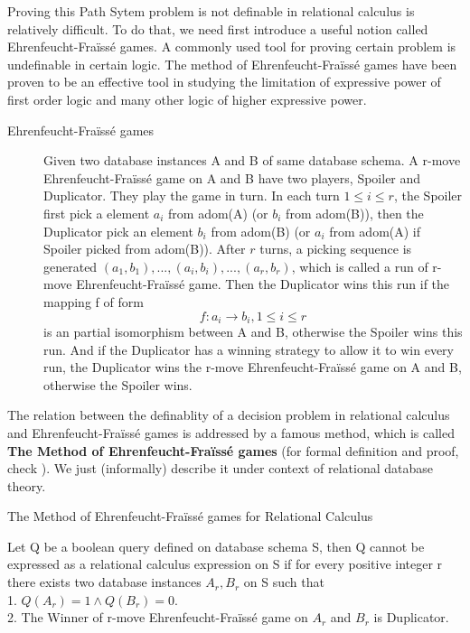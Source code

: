 Proving this Path Sytem problem is not definable in relational calculus is relatively difficult. To do that, we need first introduce a useful notion called Ehrenfeucht-Fra\"iss\'e games. A commonly used tool for proving certain problem is undefinable in certain logic. The method of Ehrenfeucht-Fra\"iss\'e games have been proven to be an effective tool in studying the limitation of expressive power of first order logic and many other logic of higher expressive power.

\begin{description}
\item[Ehrenfeucht-Fra\"iss\'e games]
Given two database instances A and B of same database schema. A r-move Ehrenfeucht-Fra\"iss\'e game on A and B have two players, Spoiler and Duplicator. They play the game in turn. In each turn $1\leq i \leq r$, the Spoiler first pick a element $a_i$ from adom(A) (or $b_i$ from adom(B)), then the Duplicator pick an element $b_i$ from adom(B) (or $a_i$ from adom(A) if Spoiler picked from adom(B)). After $r$ turns, a picking sequence is generated $(a_1, b_1),...,(a_i,b_i),...,(a_r, b_r)$, which is called a run of r-move Ehrenfeucht-Fra\"iss\'e game. Then the Duplicator wins this run if the mapping f of form
$$ f: a_i\rightarrow b_i, 1\leq i \leq r$$
is an partial isomorphism between A and B, otherwise the Spoiler wins this run. And if the Duplicator has a winning strategy to allow it to win every run, the Duplicator wins the r-move Ehrenfeucht-Fra\"iss\'e game on A and B, otherwise the Spoiler wins.
\end{description}

The relation between the definablity of a decision problem in relational calculus and Ehrenfeucht-Fra\"iss\'e games is addressed by a famous method, which is called \textbf{The Method of Ehrenfeucht-Fra\"iss\'e games} (for formal definition and proof, check \cite{kolaitis1}). We just (informally) describe it under context of relational database theory.\\

\begin{description}
\item[The Method of Ehrenfeucht-Fra\"iss\'e games for Relational Calculus]
\end{description}
Let Q be a boolean query defined on database schema S, then Q cannot be expressed as a relational calculus expression on S if for every positive integer r there exists two database instances $A_r, B_r$ on S such that\\
1. $Q(A_r)=1\land Q(B_r)=0$.\\
2. The Winner of r-move Ehrenfeucht-Fra\"iss\'e game on $A_r$ and $B_r$ is Duplicator.\\

